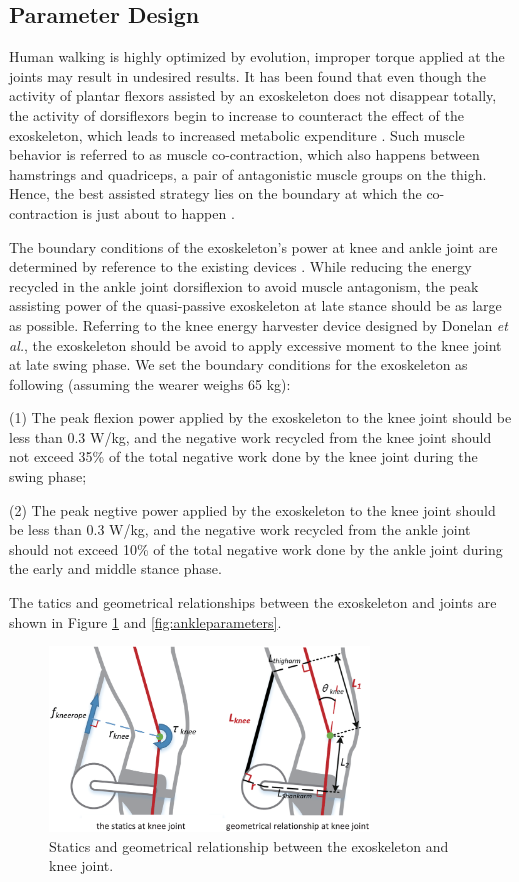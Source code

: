 \documentclass[twocolumn,cleanfoot,10pt]{asme2ej}
\begin{document}
\subsection{Parameter Design}

\label{sec:parameter design}


Human walking is highly optimized by evolution, improper torque applied at the joints may result in undesired results.  It has been found that even though the activity of plantar flexors assisted by an exoskeleton does not disappear totally, the activity of dorsiflexors begin to increase to counteract the effect of the exoskeleton, which leads to increased metabolic expenditure \cite{RN4}. Such muscle behavior is referred to as muscle co-contraction, which also happens between hamstrings and quadriceps, a pair of antagonistic muscle groups on the thigh. Hence, the best assisted strategy lies on the boundary at which the co-contraction is just about to happen \cite{RN22}. 

The boundary conditions of the exoskeleton's power at knee and ankle joint are determined by reference to the existing devices \cite{RN5,RN18}.
While reducing the energy recycled in the ankle joint dorsiflexion to avoid muscle antagonism, the peak assisting power of the quasi-passive exoskeleton at late stance should be as large as possible. Referring to the knee energy harvester device designed by Donelan \emph{et al.}, the exoskeleton should be avoid to apply excessive moment to the knee joint at late swing phase. We set the boundary conditions for the exoskeleton as following (assuming the wearer weighs 65 kg):

(1) The peak flexion power applied by the exoskeleton to the knee joint should be less than 0.3 W/kg, and the negative work recycled from the knee joint should not exceed 35\% of the total negative work done by the knee joint  during the swing phase;

(2) The peak negtive power applied by the exoskeleton to the knee joint should be less than 0.3 W/kg, and the negative work recycled from the ankle joint should not exceed 10\% of the total negative work done by the ankle joint  during the early and middle stance phase.

The tatics and geometrical relationships between the exoskeleton and joints are shown in Figure \ref{fig:kneeparameters} and \ref{fig:ankleparameters}.

\begin{figure}[t]
	\centering
	\includegraphics[width=8.5cm]{kneeparameters.eps}
	\caption{Statics and geometrical relationship between the exoskeleton and knee joint.}
	\label{fig:kneeparameters}
\end{figure}
\end{document}
